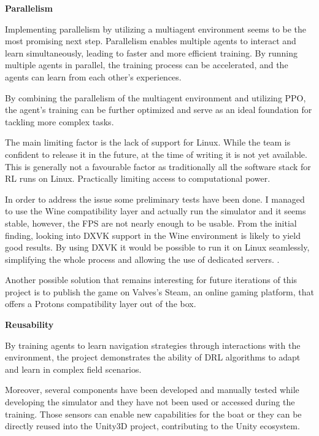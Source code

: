 \begin{textblock}
{\bf Parallelism }

Implementing parallelism by utilizing a multiagent environment seems to be the most promising next step. Parallelism enables multiple agents to interact and learn simultaneously, leading to faster and more efficient training. By running multiple agents in parallel, the training process can be accelerated, and the agents can learn from each other's experiences.

By combining the parallelism of the multiagent environment and utilizing PPO, the agent's training can be further optimized and serve as an ideal foundation for tackling more complex tasks\cite{kanervisto2020}.

The main limiting factor is the lack of support for Linux. While the team is confident to release it in the future, at the time of writing it is not yet available. This is generally not a favourable factor as traditionally all the software stack for RL runs on Linux. Practically limiting access to computational power.

In order to address the issue some preliminary tests have been done. I managed to use the Wine compatibility layer and actually run the simulator and it seems stable, however, the FPS are not nearly enough to be usable. 
From the initial finding, looking into DXVK support in the Wine environment is likely to yield good results. By using DXVK it would be possible to run it on Linux seamlessly, simplifying the whole process and allowing the use of dedicated servers. \cite{dxvksteamcommunity}\cite{dxvklc2020}.

Another possible solution that remains interesting for future iterations of this project is to publish the game on Valves’s Steam, an online gaming platform, that offers a Protons compatibility layer out of the box. 
\end{textblock}



\begin{textblock}
{\bf Reusability }

By training agents to learn navigation strategies through interactions with the environment, the project demonstrates the ability of DRL algorithms to adapt and learn in complex field scenarios.

Moreover, several components have been developed and manually tested  while developing the simulator and they have not been used or accessed during the training. Those sensors can enable new capabilities for the boat or they can be directly reused into the Unity3D project, contributing to the Unity ecosystem.

\end{textblock}




